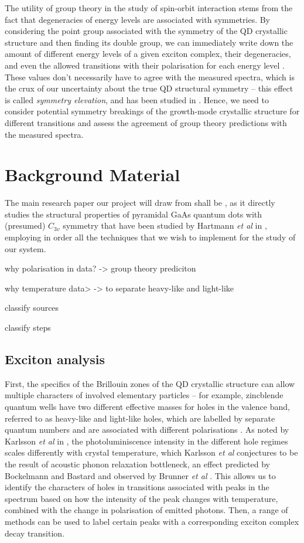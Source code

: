\documentclass[12pt]{article}
\begin{document}
The utility of group theory in the study of spin-orbit interaction stems from the fact that degeneracies of energy levels are associated with symmetries. By considering the point group associated with the symmetry of the QD crystallic structure and then finding its double group, we can immediately write down the amount of different energy levels of a given exciton complex, their degeneracies, and even the allowed transitions with their polarisation for each energy level \cite[Ch. 19]{dresselhaus}. These values don't necessarily have to agree with the measured spectra, which is the crux of our uncertainty about the true QD structural symmetry -- this effect is called \textit{symmetry elevation}, and has been studied in \cite{karlsson2}. Hence, we need to consider potential symmetry breakings of the growth-mode crystallic structure for different transitions and assess the agreement of group theory predictions with the measured spectra.

\section{Background Material}

The main research paper our project will draw from shall be \cite{karlsson}, as it directly studies the structural properties of pyramidal GaAs quantum dots with (presumed) $C_{3v}$ symmetry that have been studied by Hartmann \textit{et al} in \cite{pyramidal_qds}, employing in order all the techniques that we wish to implement for the study of our system.

why polarisation in data? -> group theory prediciton

why temperature data> -> to separate heavy-like and light-like

classify sources

classify steps

\subsection{Exciton analysis}
First, the specifics of the Brillouin zones of the QD crystallic structure can allow multiple characters of involved elementary particles -- for example, zincblende quantum wells have two different effective masses for holes in the valence band, referred to as heavy-like and light-like holes, which are labelled by separate quantum numbers and are associated with different polarisations \cite{karlsson2}. As noted by Karlsson \textit{et al} in \cite{karlsson}, the photoluminiscence intensity in the different hole regimes scales differently with crystal temperature, which Karlsson \textit{et al} conjectures to be the result of acoustic phonon relaxation bottleneck, an effect predicted by Bockelmann and Bastard \cite{bastard} and observed by Brunner \textit{et al} \cite{brunner}. This allows us to identify the characters of holes in transitions associated with peaks in the spectrum based on how the intensity of the peak changes with temperature, combined with the change in polarisation of emitted photons. Then, a range of methods can be used to label certain peaks with a corresponding exciton complex decay transition.
\end{document}

